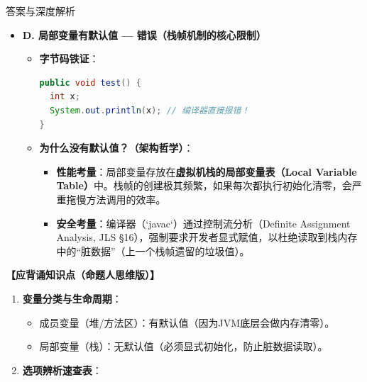 \documentclass[12pt, a4paper]{ctexart}
\begin{document}
\begin{enumerate}[label=\textbf{\arabic*.}]
\begin{bluebox}{答案与深度解析}
\begin{itemize}[leftmargin=*, nosep]
			      \item \textbf{D. 局部变量有默认值 — 错误（栈帧机制的核心限制）}
			            \begin{itemize}[leftmargin=*, nosep]
				            \item \textbf{字节码铁证}：
				                  \begin{lstlisting}[language=Java]
public void test() {
  int x;
  System.out.println(x); // 编译器直接报错！
}
                      \end{lstlisting}
				            \item \textbf{为什么没有默认值？（架构哲学）}：
				                  \begin{itemize}
					                  \item \textbf{性能考量}：局部变量存放在\textbf{虚拟机栈的局部变量表（Local Variable Table）}中。栈帧的创建极其频繁，如果每次都执行初始化清零，会严重拖慢方法调用的效率。
					                  \item \textbf{安全考量}：编译器（`javac`）通过控制流分析（Definite Assignment Analysis, JLS §16），强制要求开发者显式赋值，以杜绝读取到栈内存中的“脏数据”（上一个栈帧遗留的垃圾值）。
				                  \end{itemize}
			            \end{itemize}
		      \end{itemize}

		      \textbf{【应背诵知识点（命题人思维版）】}
		      \begin{enumerate}[leftmargin=*, nosep]
			      \item \textbf{变量分类与生命周期}：
			            \begin{itemize}
				            \item 成员变量（堆/方法区）：有默认值（因为JVM底层会做内存清零）。
				            \item 局部变量（栈）：无默认值（必须显式初始化，防止脏数据读取）。
			            \end{itemize}

			      \item \textbf{选项辨析速查表}：
			            

\end{enumerate}
\end{bluebox}
\end{enumerate}
\end{document}
